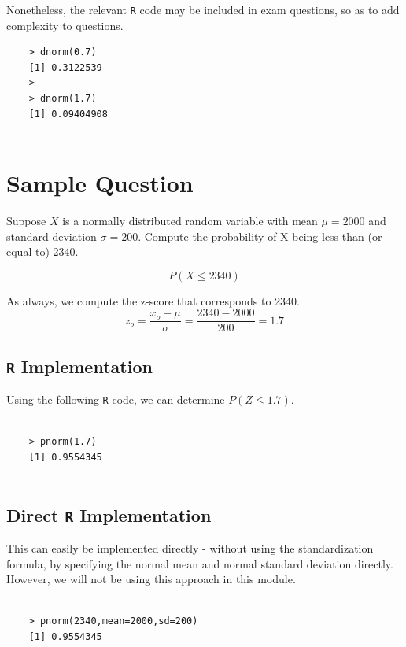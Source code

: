 \documentclass[]{report}
\begin{document}
	Nonetheless, the relevant \texttt{R} code may be included in exam questions, so as to add complexity to questions.
	
	\begin{verbatim}
	> dnorm(0.7)
	[1] 0.3122539
	>
	> dnorm(1.7)
	[1] 0.09404908
	
	\end{verbatim}
	
	
	\section{Sample Question}
	Suppose $X$ is a normally distributed random variable with mean $\mu = 2000$ and standard deviation $\sigma=200$.
	Compute the probability of X being less than (or equal to) 2340.
	
	\[P(X \leq 2340)\]
	
	As always, we compute the z-score that corresponds to 2340.
	\[ z_o = \frac{x_o - \mu}{\sigma}  = \frac{2340-2000}{200} = 1.7\]
	
	
	
	\subsection{\texttt{R} Implementation}
	
	
	Using the following \texttt{R} code, we can determine $P(Z \leq 1.7)$.
	\begin{verbatim}
	
	> pnorm(1.7)
	[1] 0.9554345
	
	\end{verbatim}
	
	
	
	
	\subsection{Direct \texttt{R} Implementation}
	
	This can easily be implemented directly - without using the standardization formula, by specifying the normal mean and normal standard deviation directly. However, we will not be using this approach in this module.
	\begin{verbatim}
	
	> pnorm(2340,mean=2000,sd=200)
	[1] 0.9554345
	
	
	\end{verbatim}
	
\end{document}
